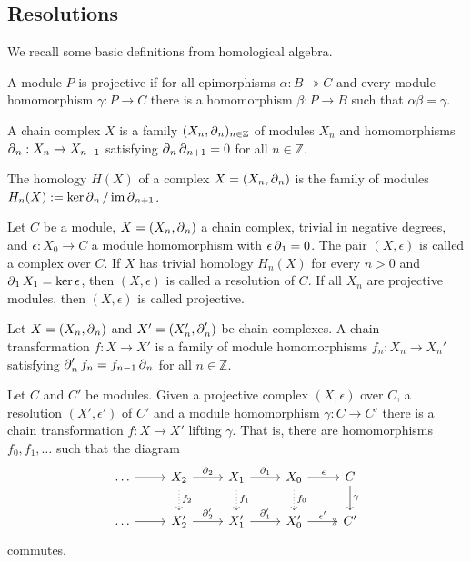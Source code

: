 \subsection{Resolutions}
We recall some basic definitions from homological algebra.
\begin{definition}
A module $P$ is projective if for all epimorphisms $\alpha: B \twoheadrightarrow C$ and every module homomorphism $\gamma: P \to C$ there is a homomorphism $\beta: P \to B$ such that $\alpha \beta = \gamma$.
\end{definition}
\begin{definition}
A chain complex $X$ is a family $(X_n,\operatorname{\partial}_{n})_{n\in \mathbb{Z}}$ of modules $X_n$ and homomorphisms $\operatorname{\partial}_{n}:X_n\to X_{n-1}$ satisfying $\operatorname{\partial}_{n}\operatorname{\partial}_{n+1} = 0$ for all $n\in \mathbb{Z}$.
\end{definition}
\begin{definition}
The homology $H(X)$ of a complex $X=(X_n,\operatorname{\partial}_{n})$ is the family of modules $H_n(X):=\ker\operatorname{\partial}_{n}/\operatorname{im} \operatorname{\partial}_{n+1}$.
\end{definition}
Let $C$ be a module, $X = (X_n, \operatorname{\partial}_{n})$ a chain complex, trivial in negative degrees, and $\epsilon:X_0 \rightarrow C$ a module homomorphism with $\epsilon \operatorname{\partial}_{1}=0$.
The pair $(X,\epsilon)$ is called a complex over $C$.
If $X$ has trivial homology $H_n(X)$ for every $n>0$ and $\operatorname{\partial}_{1}X_1 = \ker \epsilon$, then $(X,\epsilon)$ is called a resolution of $C$.
If all $X_n$ are projective modules, then $(X,\epsilon)$ is called projective.
\begin{definition}
Let $X = (X_n, \operatorname{\partial}_{n})$ and $X'=(X'_n, \operatorname{\partial}_{n}')$ be chain complexes. A chain transformation $f:X\to X'$ is a family of module homomorphisms $f_n: X_n \to X_n'$ satisfying $\operatorname{\partial}_{n}'f_n = f_{n-1}\operatorname{\partial}_{n}$ for all $n\in \mathbb{Z}$.
\end{definition}
\begin{theorem}\cite[Theorem II.6.1.]{maclane}
\label{thm:comparison}
Let $C$ and $C'$ be modules.
Given a projective complex $(X,\epsilon)$ over $C$, a resolution $(X',\epsilon')$ of $C'$ and a module homomorphism $\gamma: C\to C'$ there is a chain transformation $f:X\to X'$ lifting $\gamma$.
That is, there are homomorphisms $f_0, f_1, \dots$ such that the diagram
\[
\begin{tikzcd}
 \dots \arrow{r}& 
 X_2 \arrow{r}{\bdd{2}} \arrow[dotted]{d}{f_2}&
 X_1 \arrow{r}{\bdd{1}} \arrow[dotted]{d}{f_1}&
 X_0 \arrow{r}{\epsilon} \arrow[dotted]{d}{f_0}& 
 C \arrow{d}{\gamma} \\
 \dots \arrow{r} &
 X_2' \arrow{r}{\bdd{2}'} &
 X_1' \arrow{r}{\bdd{1}'} &
 X_0' \arrow[two heads]{r}{\epsilon'} &
 C'
\end{tikzcd}
\]
commutes.
\end{theorem}
